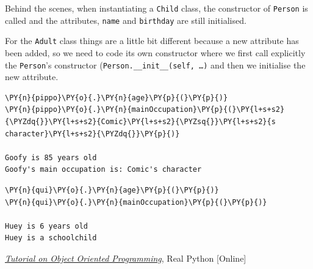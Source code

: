 Behind the scenes, when instantiating a \texttt{Child} class, the constructor of 
\texttt{Person} is called and the attributes, \texttt{name} and \texttt{birthday} are still 
initialised.  

For the \texttt{Adult} class things are a little bit different because a new attribute has been 
added, so we need to code its own constructor where we first call explicitly the 
\texttt{Person}'s constructor (\texttt{Person.\_\_init\_\_(self, \ldots)} and then we 
initialise the new attribute.

\begin{codebox}[breakable, size=fbox, boxrule=1pt, pad at break*=1mm,colback=cellbackground, colframe=cellborder]
\begin{Verbatim}[commandchars=\\\{\}]
\PY{n}{pippo}\PY{o}{.}\PY{n}{age}\PY{p}{(}\PY{p}{)}
\PY{n}{pippo}\PY{o}{.}\PY{n}{mainOccupation}\PY{p}{(}\PY{l+s+s2}{\PYZdq{}}\PY{l+s+s2}{Comic}\PY{l+s+s2}{\PYZsq{}}\PY{l+s+s2}{s character}\PY{l+s+s2}{\PYZdq{}}\PY{p}{)}

Goofy is 85 years old
Goofy's main occupation is: Comic's character
\end{Verbatim}
\end{codebox}

\begin{codebox}[breakable, size=fbox, boxrule=1pt, pad at break*=1mm,colback=cellbackground, colframe=cellborder]
\begin{Verbatim}[commandchars=\\\{\}]
\PY{n}{qui}\PY{o}{.}\PY{n}{age}\PY{p}{(}\PY{p}{)}
\PY{n}{qui}\PY{o}{.}\PY{n}{mainOccupation}\PY{p}{(}\PY{p}{)}

Huey is 6 years old
Huey is a schoolchild
\end{Verbatim}
\end{codebox}

\begin{thebibliography}{9}
 \href{https://realpython.com/python3-object-oriented-programming/}{\emph{Tutorial on Object Oriented Programming}}, Real Python [Online]
\end{thebibliography}
